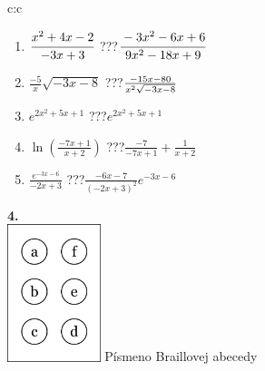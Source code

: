 \documentclass[10pt]{report}
\begin{document}
\begin{tabular}{c:c}
\begin{minipage}[c][104.5mm][t]{0.5\linewidth}
\begin{center}
\begin{minipage}{0.79\linewidth}
\begin{center}
\begin{varwidth}{\linewidth}
\begin{enumerate}
\item $\cfrac{x^2+4x-2}{-3x+3}$\quad \dotfill\; ???\;\dotfill \quad $\cfrac{-3x^2-6x+6}{9x^2-18x+9}$
\item $\frac{-5}{x}\sqrt{-3x-8}$\quad \dotfill\; ???\;\dotfill \quad $\frac{-15x-80}{x^2 \sqrt{\smash[b]{-3x-8}}}$
\item $e^{2x^2+5x+1}$\quad \dotfill\; ???\;\dotfill \quad $e^{2x^2+5x+1}$
\item $\ln{\left(\frac{-7x+1}{x+2}\right)}$\quad \dotfill\; ???\;\dotfill \quad $\frac{-7}{-7x+1}+\frac{1}{x+2}$
\item $\frac{e^{-3x-6}}{-2x+3}$\quad \dotfill\; ???\;\dotfill \quad $\frac{-6x-7}{(-2x+3)^2}e^{-3x-6}$
\end{enumerate}
\end{varwidth}
\end{center}
\end{minipage}
\begin{minipage}{0.20\linewidth}
\begin{center}
{\Huge\bfseries 4.} \\[2mm]
\includegraphics[height=40mm]{../images/braille.png}
{\small Písmeno Braillovej abecedy}
\end{center}
\end{minipage}
\end{center}
\end{minipage}
%
\end{tabular}
\newpage
\thispagestyle{empty}
\end{document}
